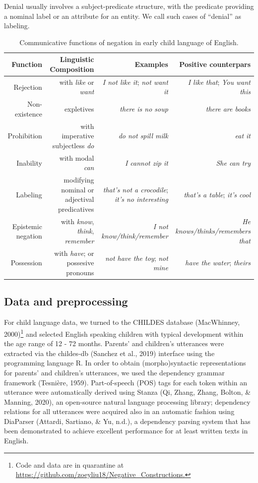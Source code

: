 \documentclass[
  english,
  man,floatsintext]{apa6}
\begin{document}
Denial usually involves a subject-predicate structure, with the predicate providing a nominal label or an attribute for an entity. We call such cases of ``denial'' as labeling.

\begin{table}[h]
\small
\centering
\begin{tabular}{rrrr}
  \hline
 \textbf{Function} & \textbf{Linguistic Composition} & \textbf{Examples} & \textbf{Positive counterpars} \\
  \hline
Rejection & with \textit{like} or \textit{want} & \textit{I not like it}; \textit{not want it}  & \textit{I like that}; \textit{You want this} \\
Non-existence & expletives & \textit{there is no soup} & \textit{there are books} \\
Prohibition & with imperative subjectless \textit{do} & \textit{do not spill milk} & \textit{eat it} \\
Inability & with modal \textit{can} & \textit{I cannot zip it} & \textit{She can try} \\
Labeling & modifying nominal or adjectival predicatives & \textit{that's not a crocodile}; \textit{it's no interesting} & \textit{that's a table}; \textit{it's cool} \\
Epistemic negation & with \textit{know}, \textit{think}, \textit{remember}  & \textit{I not know/think/remember} & \textit{He knows/thinks/remembers that} \\
Possession & with \textit{have}; or possesive pronouns & \textit{not have the toy}; \textit{not mine} & \textit{have the water}; \textit{theirs} \\
   \hline
\end{tabular}
\caption{Communicative functions of negation in early child language of English.}
\end{table}

\hypertarget{data-and-preprocessing}{%
\subsection{Data and preprocessing}\label{data-and-preprocessing}}

For child language data, we turned to the CHILDES database (MacWhinney, 2000)\footnote{Code and data are in quarantine at \url{https://github.com/zoeyliu18/Negative_Constructions.}} and selected English speaking children with typical development within the age range of 12 - 72 months. Parents' and children's utterances were extracted via the childes-db (Sanchez et al., 2019) interface using the programming language R. In order to obtain (morpho)syntactic representations for parents' and children's utterances, we used the dependency grammar framework (Tesnière, 1959). Part-of-speech (POS) tags for each token within an utterance were automatically derived using Stanza (Qi, Zhang, Zhang, Bolton, \& Manning, 2020), an open-source natural language processing library; dependency relations for all utterances were acquired also in an automatic fashion using DiaParser (Attardi, Sartiano, \& Yu, n.d.), a dependency parsing system that has been demonstrated to achieve excellent performance for at least written texts in English.
\end{document}
